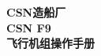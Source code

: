 \begin{titlepage}
	\begin{center}
		\vspace{1cm}
		{\Large \textbf{CSN造船厂}}\\
		\vspace{1.5cm}
		{\Large \textbf{CSN F9}}\\
		\vspace{1.5cm}
		{\Large \textbf{飞行机组操作手册}}\\
		\vfill
		\vspace{1.8cm}
		\doclicenseThis
	\end{center}
\end{titlepage}